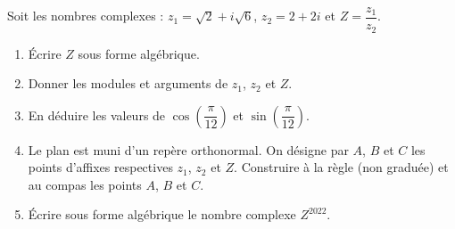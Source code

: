 \documentclass[a4paper,12pt]{article}
\begin{document}
\begin{tcolorbox}[title={Exercice 15 - {[}Calculer, Représenter{]}}]
Soit les nombres complexes :
\( z_1 = \sqrt{2} + i\sqrt{6} \), \( z_2 = 2 + 2i \) et \( Z = \dfrac{z_1}{z_2} \).
\begin{enumerate}
    \item Écrire \( Z \) sous forme algébrique.
    \item Donner les modules et arguments de \( z_1 \), \( z_2 \) et \( Z \).
    \item En déduire les valeurs de \( \cos \left( \dfrac{\pi}{12} \right) \) et \( \sin \left( \dfrac{\pi}{12} \right) \).
    \item Le plan est muni d’un repère orthonormal. On désigne par \( A \), \( B \) et \( C \) les points d’affixes respectives \( z_1 \), \( z_2 \) et \( Z \). Construire à la règle (non graduée) et au compas les points \( A \), \( B \) et \( C \).
    \item Écrire sous forme algébrique le nombre complexe \( Z^{2022} \).
\end{enumerate}
\end{tcolorbox}
\end{document}
